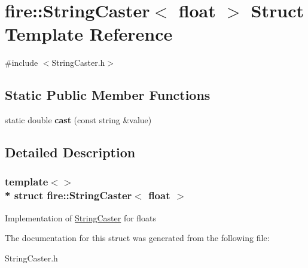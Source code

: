 \hypertarget{a00295}{}\section{fire\+:\+:String\+Caster$<$ float $>$ Struct Template Reference}
\label{a00295}


{\ttfamily \#include $<$String\+Caster.\+h$>$}

\subsection*{Static Public Member Functions}
\begin{DoxyCompactItemize}
\item 
static double {\bfseries cast} (const string \&value)\hypertarget{a00295_a3dbc17ad2b6b2185fea43993871f24f7}{}\label{a00295_a3dbc17ad2b6b2185fea43993871f24f7}

\end{DoxyCompactItemize}


\subsection{Detailed Description}
\subsubsection*{template$<$$>$\\*
struct fire\+::\+String\+Caster$<$ float $>$}

Implementation of \hyperlink{a00292}{String\+Caster} for floats 

The documentation for this struct was generated from the following file\+:\begin{DoxyCompactItemize}
\item 
String\+Caster.\+h\end{DoxyCompactItemize}
